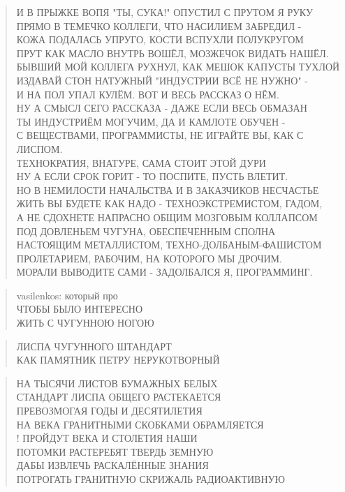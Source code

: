 \begin{verse}
И В ПРЫЖКЕ ВОПЯ "ТЫ, СУКА!" ОПУСТИЛ С ПРУТОМ Я РУКУ\\
ПРЯМО В ТЕМЕЧКО КОЛЛЕГИ, ЧТО НАСИЛИЕМ ЗАБРЕДИЛ - \\
КОЖА ПОДАЛАСЬ УПРУГО, КОСТИ ВСПУХЛИ ПОЛУКРУГОМ\\
ПРУТ КАК МАСЛО ВНУТРЬ ВОШЁЛ, МОЗЖЕЧОК ВИДАТЬ НАШЁЛ.\\
БЫВШИЙ МОЙ КОЛЛЕГА РУХНУЛ, КАК МЕШОК КАПУСТЫ ТУХЛОЙ\\
ИЗДАВАЙ СТОН НАТУЖНЫЙ "ИНДУСТРИИ ВСЁ НЕ НУЖНО" - \\
И НА ПОЛ УПАЛ КУЛЁМ. ВОТ И ВЕСЬ РАССКАЗ О НЁМ.\\
НУ А СМЫСЛ СЕГО РАССКАЗА - ДАЖЕ ЕСЛИ ВЕСЬ ОБМАЗАН\\
ТЫ ИНДУСТРИЁМ МОГУЧИМ, ДА И КАМЛОТЕ ОБУЧЕН -\\
С ВЕЩЕСТВАМИ, ПРОГРАММИСТЫ, НЕ ИГРАЙТЕ ВЫ, КАК С ЛИСПОМ.\\
ТЕХНОКРАТИЯ, ВНАТУРЕ, САМА СТОИТ ЭТОЙ ДУРИ\\
НУ А ЕСЛИ СРОК ГОРИТ - ТО ПОСПИТЕ, ПУСТЬ ВЛЕТИТ.\\
НО В НЕМИЛОСТИ НАЧАЛЬСТВА И В ЗАКАЗЧИКОВ НЕСЧАСТЬЕ\\
ЖИТЬ ВЫ БУДЕТЕ КАК НАДО - ТЕХНОЭКСТРЕМИСТОМ, ГАДОМ, \\
А НЕ СДОХНЕТЕ НАПРАСНО ОБЩИМ МОЗГОВЫМ КОЛЛАПСОМ\\
ПОД ДОВЛЕНЬЕМ ЧУГУНА, ОБЕСПЕЧЕННЫМ СПОЛНА\\
НАСТОЯЩИМ МЕТАЛЛИСТОМ, ТЕХНО-ДОЛБАНЫМ-ФАШИСТОМ\\
ПРОЛЕТАРИЕМ, РАБОЧИМ, НА КОТОРОГО МЫ ДРОЧИМ.\\
МОРАЛИ ВЫВОДИТЕ САМИ - ЗАДОЛБАЛСЯ Я, ПРОГРАММИНГ.
\end{verse}

\poemtitle{***}
\begin{verse}
vasilenkos: который про\\
ЧТОБЫ БЫЛО ИНТЕРЕСНО\\
ЖИТЬ С ЧУГУННОЮ НОГОЮ
\end{verse}

\poemtitle{***}
\begin{verse}
ЛИСПА ЧУГУННОГО ШТАНДАРТ\\
КАК ПАМЯТНИК ПЕТРУ НЕРУКОТВОРНЫЙ
\end{verse}

\poemtitle{***}
\begin{verse}
НА ТЫСЯЧИ ЛИСТОВ БУМАЖНЫХ БЕЛЫХ\\
СТАНДАРТ ЛИСПА ОБЩЕГО РАСТЕКАЕТСЯ\\
ПРЕВОЗМОГАЯ ГОДЫ И ДЕСЯТИЛЕТИЯ\\
НА ВЕКА ГРАНИТНЫМИ СКОБКАМИ ОБРАМЛЯЕТСЯ\\!
ПРОЙДУТ ВЕКА И СТОЛЕТИЯ НАШИ\\
ПОТОМКИ РАСТЕРЕБЯТ ТВЕРДЬ ЗЕМНУЮ\\
ДАБЫ ИЗВЛЕЧЬ РАСКАЛЁННЫЕ ЗНАНИЯ\\
ПОТРОГАТЬ ГРАНИТНУЮ СКРИЖАЛЬ РАДИОАКТИВНУЮ
\end{verse}

